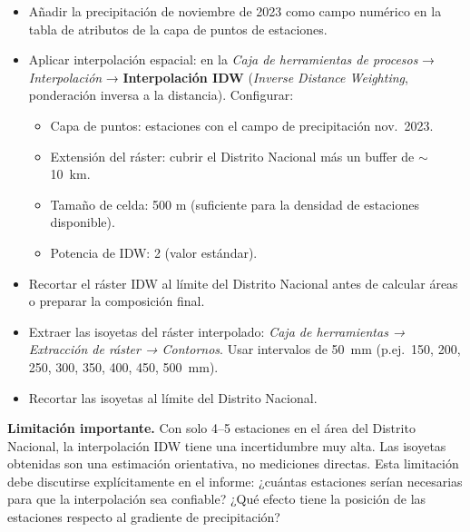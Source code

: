 \documentclass[11pt]{article}
\begin{document}
\begin{itemize}
  \item Añadir la precipitación de noviembre de 2023 como campo numérico en
    la tabla de atributos de la capa de puntos de estaciones.

  \item Aplicar interpolación espacial: en la \emph{Caja de herramientas de
    procesos} → \emph{Interpolación} → \textbf{Interpolación IDW}
    (\emph{Inverse Distance Weighting}, ponderación inversa a la distancia).
    Configurar:
    \begin{itemize}
      \item Capa de puntos: estaciones con el campo de precipitación nov.\ 2023.
      \item Extensión del ráster: cubrir el Distrito Nacional más un buffer
        de $\sim$10~km.
      \item Tamaño de celda: 500 m (suficiente para la densidad de estaciones disponible).
      \item Potencia de IDW: 2 (valor estándar).
    \end{itemize}

  \item Recortar el ráster IDW al límite del Distrito Nacional antes de calcular
    áreas o preparar la composición final.

  \item Extraer las isoyetas del ráster interpolado: \emph{Caja de herramientas →
    Extracción de ráster → Contornos}.
    Usar intervalos de 50~mm (p.ej.\ 150, 200, 250, 300, 350, 400, 450, 500~mm).

  \item Recortar las isoyetas al límite del Distrito Nacional.
\end{itemize}

\begin{warnbox}
\textbf{Limitación importante.}
Con solo 4--5 estaciones en el área del Distrito Nacional, la interpolación IDW
tiene una incertidumbre muy alta.  Las isoyetas obtenidas son una estimación
orientativa, no mediciones directas.  Esta limitación debe discutirse explícitamente
en el informe: ¿cuántas estaciones serían necesarias para que la interpolación
sea confiable?  ¿Qué efecto tiene la posición de las estaciones respecto al
gradiente de precipitación?
\end{warnbox}

\end{document}
